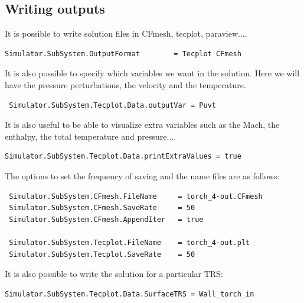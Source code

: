 \documentclass[11pt]{article}
\begin{document}
\subsection{Writing outputs}
It is possible to write solution files in CFmesh, tecplot, paraview....
\begin{verbatim}
Simulator.SubSystem.OutputFormat        = Tecplot CFmesh
\end{verbatim}
It is also possible to specify which variables we want in the solution.
Here we will have the pressure perturbations, the velocity and the temperature. 
\begin{verbatim}
 Simulator.SubSystem.Tecplot.Data.outputVar = Puvt
\end{verbatim}
It is also useful to be able to visualize extra variables such as the Mach, the enthalpy, the total temperature and pressure....
\begin{verbatim}
Simulator.SubSystem.Tecplot.Data.printExtraValues = true
\end{verbatim}
The options to set the frequency of saving and the name files are as follows:
\begin{verbatim}
 Simulator.SubSystem.CFmesh.FileName     = torch_4-out.CFmesh
 Simulator.SubSystem.CFmesh.SaveRate     = 50
 Simulator.SubSystem.CFmesh.AppendIter   = true
 
 Simulator.SubSystem.Tecplot.FileName    = torch_4-out.plt
 Simulator.SubSystem.Tecplot.SaveRate    = 50 
\end{verbatim}
It is also possible to write the solution for a particular TRS:
\begin{verbatim}
Simulator.SubSystem.Tecplot.Data.SurfaceTRS = Wall_torch_in
\end{verbatim}
\end{document}
